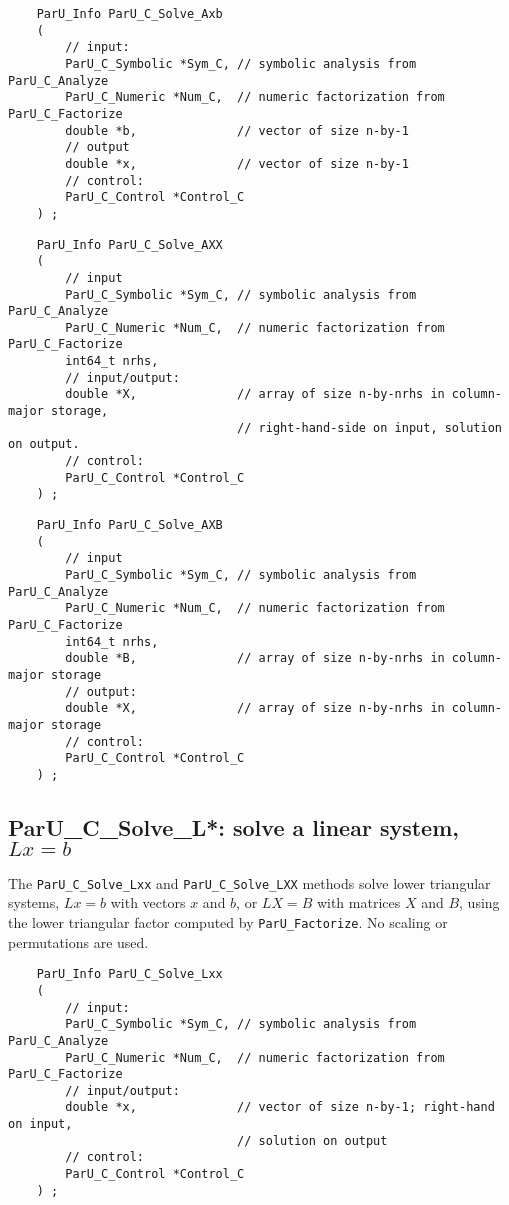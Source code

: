 \documentclass[12pt]{article}
\begin{document}
    {\footnotesize
    \begin{verbatim}
    ParU_Info ParU_C_Solve_Axb
    (
        // input:
        ParU_C_Symbolic *Sym_C, // symbolic analysis from ParU_C_Analyze
        ParU_C_Numeric *Num_C,  // numeric factorization from ParU_C_Factorize
        double *b,              // vector of size n-by-1
        // output
        double *x,              // vector of size n-by-1
        // control:
        ParU_C_Control *Control_C
    ) ; \end{verbatim} }

    {\footnotesize
    \begin{verbatim}
    ParU_Info ParU_C_Solve_AXX
    (
        // input
        ParU_C_Symbolic *Sym_C, // symbolic analysis from ParU_C_Analyze
        ParU_C_Numeric *Num_C,  // numeric factorization from ParU_C_Factorize
        int64_t nrhs,
        // input/output:
        double *X,              // array of size n-by-nrhs in column-major storage,
                                // right-hand-side on input, solution on output.
        // control:
        ParU_C_Control *Control_C
    ) ; \end{verbatim} }

    {\footnotesize
    \begin{verbatim}
    ParU_Info ParU_C_Solve_AXB
    (
        // input
        ParU_C_Symbolic *Sym_C, // symbolic analysis from ParU_C_Analyze
        ParU_C_Numeric *Num_C,  // numeric factorization from ParU_C_Factorize
        int64_t nrhs,
        double *B,              // array of size n-by-nrhs in column-major storage
        // output:
        double *X,              // array of size n-by-nrhs in column-major storage
        // control:
        ParU_C_Control *Control_C
    ) ; \end{verbatim} }

\subsection{{\sf ParU\_C\_Solve\_L*}: solve a linear system, $Lx=b$}

    The \verb'ParU_C_Solve_Lxx' and \verb'ParU_C_Solve_LXX' methods solve lower
    triangular systems, $Lx=b$ with vectors $x$ and $b$, or $LX=B$ with
    matrices $X$ and $B$, using the lower triangular factor computed by
    \verb'ParU_Factorize'.  No scaling or permutations are used.

    {\footnotesize
    \begin{verbatim}
    ParU_Info ParU_C_Solve_Lxx
    (
        // input:
        ParU_C_Symbolic *Sym_C, // symbolic analysis from ParU_C_Analyze
        ParU_C_Numeric *Num_C,  // numeric factorization from ParU_C_Factorize
        // input/output:
        double *x,              // vector of size n-by-1; right-hand on input,
                                // solution on output
        // control:
        ParU_C_Control *Control_C
    ) ; \end{verbatim} }
\end{document}
